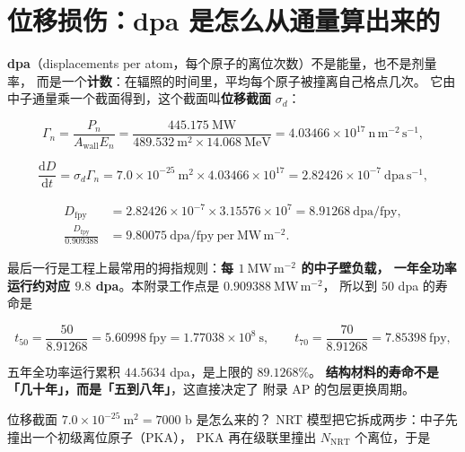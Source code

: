 \section{位移损伤：dpa 是怎么从通量算出来的}
\label{sec:app-ay-dpa}

\textbf{dpa}（displacements per atom，每个原子的离位次数）不是能量，也不是剂量率，
而是一个\textbf{计数}：在辐照的时间里，平均每个原子被撞离自己格点几次。
它由中子通量乘一个截面得到，这个截面叫\textbf{位移截面} $\sigma_d$：

\begin{equation}
\Gamma_n=\frac{P_n}{A_\mathrm{wall}E_n}
=\frac{445.175\ \mathrm{MW}}{489.532\ \mathrm{m^2}\times14.068\ \mathrm{MeV}}
=4.03466\times10^{17}\ \mathrm{n\,m^{-2}\,s^{-1}},
\label{eq:app-ay-flux}
\end{equation}

\begin{equation}
\frac{\mathrm{d}D}{\mathrm{d}t}=\sigma_d\Gamma_n
=7.0\times10^{-25}\ \mathrm{m^2}\times4.03466\times10^{17}
=2.82426\times10^{-7}\ \mathrm{dpa\,s^{-1}},
\label{eq:app-ay-dpa}
\end{equation}

\begin{equation}
\begin{aligned}
D_\mathrm{fpy}&=2.82426\times10^{-7}\times3.15576\times10^{7}
=8.91268\ \mathrm{dpa/fpy},\\
\frac{D_\mathrm{fpy}}{0.909388}&=9.80075\ \mathrm{dpa/fpy\ per\ MW\,m^{-2}}.
\end{aligned}
\label{eq:app-ay-fpy}
\end{equation}

最后一行是工程上最常用的拇指规则：\textbf{每 $1\ \mathrm{MW\,m^{-2}}$ 的中子壁负载，
一年全功率运行约对应 $9.8$ dpa}。本附录工作点是 $0.909388\ \mathrm{MW\,m^{-2}}$，
所以到 $50$ dpa 的寿命是

\begin{equation}
t_{50}=\frac{50}{8.91268}=5.60998\ \mathrm{fpy}
=1.77038\times10^{8}\ \mathrm{s},
\qquad
t_{70}=\frac{70}{8.91268}=7.85398\ \mathrm{fpy},
\label{eq:app-ay-life}
\end{equation}

五年全功率运行累积 $44.5634$ dpa，是上限的 $89.1268\%$。
\textbf{结构材料的寿命不是「几十年」，而是「五到八年」}，这直接决定了
附录 AP 的包层更换周期。

位移截面 $7.0\times10^{-25}\ \mathrm{m^2}=7000$ b 是怎么来的？
NRT 模型把它拆成两步：中子先撞出一个初级离位原子（PKA），
PKA 再在级联里撞出 $N_\mathrm{NRT}$ 个离位，于是

